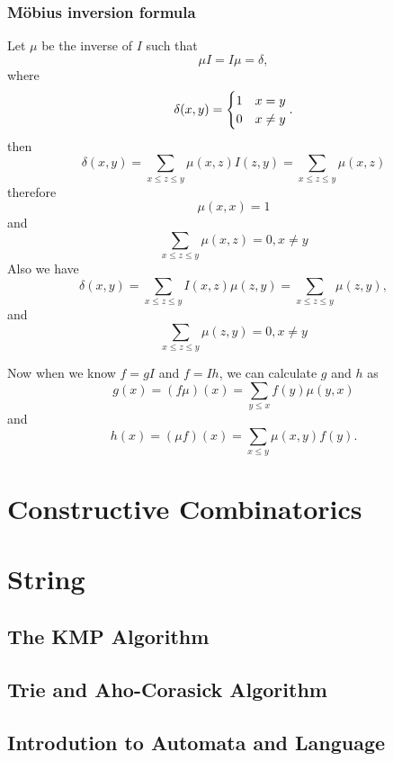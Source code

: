 \subsubsection{M\"obius inversion formula}
Let $\mu$ be the inverse of $I$ such that
$$\mu I = I \mu = \delta,$$
where
$$\delta(x , y) = \begin{cases} 1 & x = y\cr 0 & x \neq y \end{cases}.$$
then $$\delta(x,y) = \sum_{x \leq z \leq y} \mu(x,z) I(z,y)
= \sum_{x \leq z \leq y} \mu(x,z)$$
therefore $$\mu(x,x)=1$$
and $$\sum_{x \leq z \leq y}\mu(x,z) = 0, x \neq y$$
Also we have
$$\delta(x,y) = \sum_{x \leq z \leq y} I(x,z) \mu(z,y)
= \sum_{x \leq z \leq y} \mu(z,y),$$
and $$\sum_{x \leq z \leq y}\mu(z,y) = 0, x \neq y$$

Now when we know $f=gI$ and $f=Ih$,
we can calculate $g$ and $h$ as
$$g(x) = (f \mu)(x) = \sum_{y \leq x} f(y) \mu(y, x)$$
and
$$h(x) = (\mu f)(x) = \sum_{x \leq y} \mu(x, y) f(y).$$


\section{Constructive Combinatorics}

\section{String}
\subsection{The KMP Algorithm}
\subsection{Trie and Aho-Corasick Algorithm}
\subsection{Introdution to Automata and Language}
